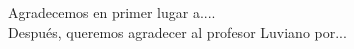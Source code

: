 Agradecemos en primer lugar a.... \\
\noindent Despu\'es, queremos agradecer al profesor Luviano por...